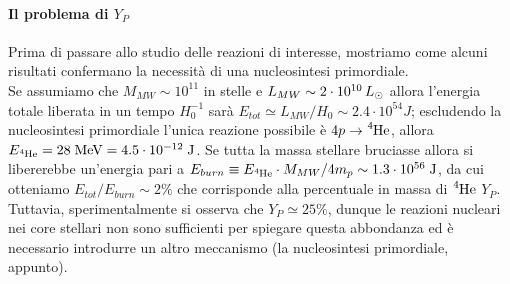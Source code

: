 \paragraph{Il problema di $Y_P$} Prima di passare allo studio delle reazioni di interesse, mostriamo come alcuni risultati confermano la necessità di una nucleosintesi primordiale.\\
Se assumiamo che $M_{MW} \sim 10^{11}$ \Msol{} in stelle e $L_{MW}\sim 2\cdot 10^{10}\,L_{\odot} {}$ allora l'energia totale liberata in un tempo $H_0^{-1}$ sarà $E_{tot} \simeq L_{MW}/H_0\sim 2.4\cdot 10^{54}\unit{J}$; escludendo la nucleosintesi primordiale l'unica reazione possibile è $4p\to\ce{^4He}$, allora $E_{\ce{^4He}} = 28\unit{MeV}= 4.5 \cdot \ord{-12}\unit{J}$. Se tutta la massa stellare bruciasse allora si libererebbe un'energia pari a $E_{burn} \equiv E_{\ce{^4He}}\cdot M_{MW}/4m_p\sim 1.3\cdot \ord{56}\unit{J}$, da cui otteniamo $E_{tot}/E_{burn}\sim 2\%$ che corrisponde alla percentuale in massa di $\ce{^4He}$  $Y_P$. Tuttavia, sperimentalmente si osserva che $Y_P\simeq 25\%$, dunque le reazioni nucleari nei core stellari non sono sufficienti per spiegare questa abbondanza ed è necessario introdurre un altro meccanismo (la nucleosintesi primordiale, appunto).

